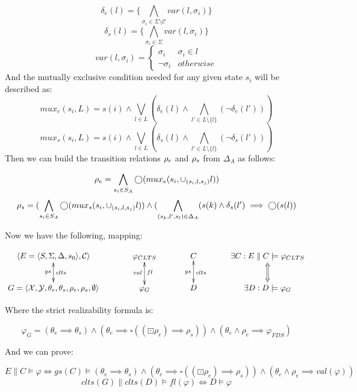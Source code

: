 \[\delta_e(l) = \{\bigwedge_{\sigma_i \in \Sigma \setminus \mathcal{C}}var(l, \sigma_i)\}\]
\[\delta_s(l) = \{\bigwedge_{\sigma_i \in \Sigma}var(l, \sigma_i)\}\]
\[
var(l, \sigma_i) = \begin{cases}
\sigma_i & \sigma_i \in l \\
\neg \sigma_i & otherwise
\end{cases}
\]
And the mutually exclusive condition needed for any given state $s_i$ will be described as:
\[mux_e(s_i,L) = s(i) \wedge \bigvee_{l \in L}(\delta_e(l) \wedge \bigwedge_{l' \in L \setminus \{l\}}(\neg \delta_e(l')) ) \]
\[mux_s(s_i,L) = s(i) \wedge \bigvee_{l \in L}(\delta_s(l) \wedge \bigwedge_{l' \in L \setminus \{l\}}(\neg \delta_s(l')) ) \]
Then we can build the transition relations ${\rho_e}$ and ${\rho_s}$ from $\Delta_A$ as follows:

\[ {\rho_e} = \bigwedge_{s_i \in S_A} \bigcirc(mux_e(s_i,\cup_{(s_i,l,s_j)}l))\]
\[ {\rho_s} = (\bigwedge_{s_i \in S_A} \bigcirc(mux_s(s_i,\cup_{(s_i,l,s_j)}l)) \wedge (\bigwedge_{(s_k,l',s_l) \in \Delta_A} (s(k) \wedge \delta_s(l') \implies \bigcirc(s(l))\]

Now we have the following, mapping:

\[\xymatrix@C+1pc{
	\langle E = \langle S, \Sigma, \Delta, s_0 \rangle, \mathcal{C} \rangle \ar@{<->}[d]^{clts}_{gs}
	& \varphi_{CLTS}\ar@{<->}[d]^{fl}_{val}
	& C\ar@{<->}[d]^{clts}_{gs}
	& \exists C: E\parallel C \models  \varphi_{CLTS}\ar@{<=>}[d]\\
	G = \langle \mathcal{X},\mathcal{Y},\theta_e,\theta_s,\rho_e,\rho_s, \emptyset \rangle
	& \varphi_G
	& D
	&\exists D: D \models \varphi_G\\
}\]

Where the strict realizability formula is:

\[\varphi_G = (\theta_e \implies \theta_s) \wedge (\theta_e \implies \square((\boxdot \rho_e) \implies \rho_s)) \wedge (\theta_e \wedge \rho_e \implies \varphi_{FDS}) \]

And we can prove:

\[E\parallel C \models  \varphi \iff gs(C) \models (\theta_e \implies \theta_s) \wedge (\theta_e \implies \square((\boxdot \rho_e) \implies \rho_s)) \wedge (\theta_e \wedge \rho_e \implies val(\varphi))
\]
\[clts(G) \parallel clts(D) \models  fl(\varphi) \iff D \models \varphi \]
